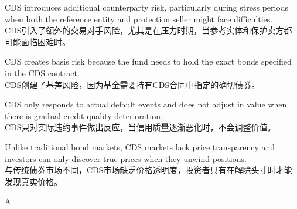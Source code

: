 \documentclass{article}
\begin{document}
            \begin{choices}
                \item CDS introduces additional counterparty risk, particularly during stress periods when both the reference entity and protection seller might face difficulties.\\
                CDS引入了额外的交易对手风险，尤其是在压力时期，当参考实体和保护卖方都可能面临困难时。
                \item CDS creates basis risk because the fund needs to hold the exact bonds specified in the CDS contract.\\
                CDS创建了基差风险，因为基金需要持有CDS合同中指定的确切债券。
                \item CDS only responds to actual default events and does not adjust in value when there is gradual credit quality deterioration.\\
                CDS只对实际违约事件做出反应，当信用质量逐渐恶化时，不会调整价值。
                \item Unlike traditional bond markets, CDS markets lack price transparency and investors can only discover true prices when they unwind positions.\\
                与传统债券市场不同，CDS市场缺乏价格透明度，投资者只有在解除头寸时才能发现真实价格。
            \end{choices}
            
            \begin{correctanswer}
            A
            \end{correctanswer}
            
\end{document}
